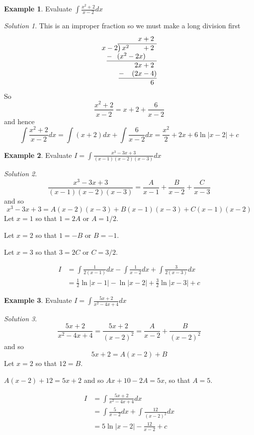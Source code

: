 \documentclass[
  11pt,
  oneside]{book}
\newcommand{\slide}{}
\theoremstyle{definition}
\theoremstyle{definition}
\newtheorem{example}{Example}[chapter]
\theoremstyle{definition}
\theoremstyle{definition}
\theoremstyle{remark}
\newtheorem*{solution}{Solution}
\begin{document}
\begin{example}
Evaluate \(\displaystyle\int\frac{x^2+2}{x-2}dx\)
\end{example}

\begin{solution}
This is an improper fraction so we must make a long division first
\[
\begin{array}{r}
x+2\phantom{)}   \\
x-2{\overline{\smash{\big)}\,x^2\phantom{+2x}+2\phantom{)}}}\\
\underline{-~\phantom{(}(x^2-2x)\phantom{-b)}}\\
\phantom{0+}2x+2\phantom{)}\\ 
\underline{-~\phantom{()}(2x-4)}\\ 
\phantom{0+}6\phantom{)}
\end{array}
\]
So
\[
\frac{x^2+2}{x-2} = x+2+\frac6{x-2}
\]
and hence
\[
\int\frac{x^2+2}{x-2}dx = \int (x+2)dx+\int\frac6{x-2}dx = \frac{x^2}{2}+2x+6\ln|x-2|+c
\]
\end{solution}

\slide

\begin{example}
Evaluate \(I = \displaystyle\int\frac{x^3-3x+3}{(x-1)(x-2)(x-3)} dx\)
\end{example}

\begin{solution}
\[
\frac{x^3-3x+3}{(x-1)(x-2)(x-3)} = \frac A{x-1}+\frac B{x-2}+\frac C{x-3}
\]
and so
\[
x^3-3x+3 = A(x-2)(x-3) + B(x-1)(x-3) + C(x-1)(x-2)
\]
Let \(x=1\) so that \(1=2A\) or \(A=1/2\).

Let \(x=2\) so that \(1=-B\) or \(B=-1\).

Let \(x=3\) so that \(3=2C\) or \(C=3/2\).

\begin{align*}
I&= \int\frac 1{2(x-1)}dx-\int\frac 1{x-2}dx+\int\frac 3{2(x-3)}dx\\
&=\frac 12\ln|x-1| -\ln|x-2| + \frac 32\ln|x-3|+c
\end{align*}
\end{solution}

\slide

\begin{example}
Evaluate \(I = \displaystyle\int\frac{5x+2}{x^2-4x+4} dx\)
\end{example}

\begin{solution}
\[
\frac{5x+2}{x^2-4x+4} = \frac{5x+2}{(x-2)^2} = \frac A{x-2}+\frac{B}{(x-2)^2}
\]
and so
\[
5x+2 = A(x-2)+B
\]
Let \(x=2\) so that \(12=B\).

\(A(x-2)+12 = 5x+2\) and so \(Ax+10-2A=5x\), so that \(A=5\).

\begin{align*}
I&= \int\frac{5x+2}{x^2-4x+4} dx\\
&=\int\frac5{x-2}dx+\int\frac{12}{(x-2)^2}dx\\
&=5\ln|x-2|-\frac{12}{x-2}+c
\end{align*}
\end{solution}
\end{document}
